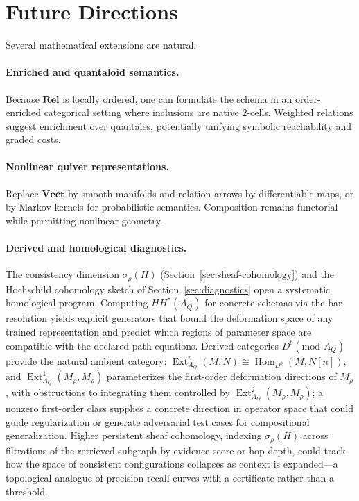 \documentclass[11pt]{article}
\newcommand{\Rel}{\mathbf{Rel}}
\newcommand{\Vect}{\mathbf{Vect}}
\newcommand{\Hom}{\operatorname{Hom}}
\newcommand{\Ext}{\operatorname{Ext}}
\begin{document}
\section{Future Directions}

Several mathematical extensions are natural.

\paragraph{Enriched and quantaloid semantics.}
Because $\Rel$ is locally ordered, one can formulate the schema in an order-enriched categorical setting where inclusions are native $2$-cells. Weighted relations suggest enrichment over quantales, potentially unifying symbolic reachability and graded costs.

\paragraph{Nonlinear quiver representations.}
Replace $\Vect$ by smooth manifolds and relation arrows by differentiable maps, or by Markov kernels for probabilistic semantics. Composition remains functorial while permitting nonlinear geometry.

\paragraph{Derived and homological diagnostics.}
The consistency dimension $\sigma_\rho(H)$ (Section~\ref{sec:sheaf-cohomology}) and the Hochschild cohomology sketch of Section~\ref{sec:diagnostics} open a systematic homological program. Computing $HH^*(A_Q)$ for concrete schemas via the bar resolution yields explicit generators that bound the deformation space of any trained representation and predict which regions of parameter space are compatible with the declared path equations. Derived categories $D^b(\mathrm{mod}\text{-}A_Q)$ provide the natural ambient category: $\Ext^n_{A_Q}(M,N)\cong\Hom_{D^b}(M,N[n])$, and $\Ext^1_{A_Q}(M_\rho,M_\rho)$ parameterizes the first-order deformation directions of $M_\rho$, with obstructions to integrating them controlled by $\Ext^2_{A_Q}(M_\rho,M_\rho)$; a nonzero first-order class supplies a concrete direction in operator space that could guide regularization or generate adversarial test cases for compositional generalization. Higher persistent sheaf cohomology, indexing $\sigma_\rho(H)$ across filtrations of the retrieved subgraph by evidence score or hop depth, could track how the space of consistent configurations collapses as context is expanded---a topological analogue of precision-recall curves with a certificate rather than a threshold.
\end{document}
